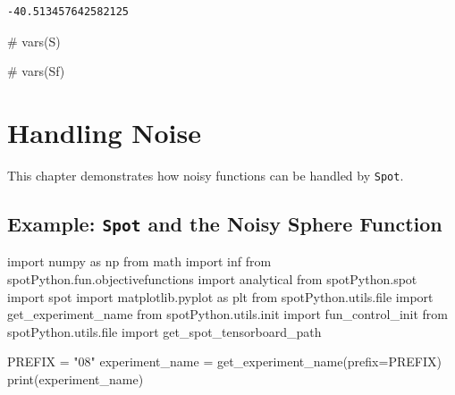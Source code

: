 \documentclass[
  letterpaper,
  DIV=11,
  numbers=noendperiod]{scrreprt}
\newenvironment{Shaded}{\begin{snugshade}}{\end{snugshade}}
\newcommand{\BuiltInTok}[1]{\textcolor[rgb]{0.00,0.23,0.31}{#1}}
\newcommand{\CommentTok}[1]{\textcolor[rgb]{0.37,0.37,0.37}{#1}}
\newcommand{\ImportTok}[1]{\textcolor[rgb]{0.00,0.46,0.62}{#1}}
\newcommand{\NormalTok}[1]{\textcolor[rgb]{0.00,0.23,0.31}{#1}}
\newcommand{\OperatorTok}[1]{\textcolor[rgb]{0.37,0.37,0.37}{#1}}
\newcommand{\StringTok}[1]{\textcolor[rgb]{0.13,0.47,0.30}{#1}}
\begin{document}
\begin{verbatim}
-40.513457642582125
\end{verbatim}

\begin{Shaded}
\begin{Highlighting}[]
\CommentTok{\# vars(S)}
\end{Highlighting}
\end{Shaded}

\begin{Shaded}
\begin{Highlighting}[]
\CommentTok{\# vars(Sf)}
\end{Highlighting}
\end{Shaded}

\hypertarget{sec-noise}{%
\chapter{Handling Noise}\label{sec-noise}}

This chapter demonstrates how noisy functions can be handled by
\texttt{Spot}.

\hypertarget{example-spot-and-the-noisy-sphere-function}{%
\section{\texorpdfstring{Example: \texttt{Spot} and the Noisy Sphere
Function}{Example: Spot and the Noisy Sphere Function}}\label{example-spot-and-the-noisy-sphere-function}}

\begin{Shaded}
\begin{Highlighting}[]
\ImportTok{import}\NormalTok{ numpy }\ImportTok{as}\NormalTok{ np}
\ImportTok{from}\NormalTok{ math }\ImportTok{import}\NormalTok{ inf}
\ImportTok{from}\NormalTok{ spotPython.fun.objectivefunctions }\ImportTok{import}\NormalTok{ analytical}
\ImportTok{from}\NormalTok{ spotPython.spot }\ImportTok{import}\NormalTok{ spot}
\ImportTok{import}\NormalTok{ matplotlib.pyplot }\ImportTok{as}\NormalTok{ plt}
\ImportTok{from}\NormalTok{ spotPython.utils.}\BuiltInTok{file} \ImportTok{import}\NormalTok{ get\_experiment\_name}
\ImportTok{from}\NormalTok{ spotPython.utils.init }\ImportTok{import}\NormalTok{ fun\_control\_init}
\ImportTok{from}\NormalTok{ spotPython.utils.}\BuiltInTok{file} \ImportTok{import}\NormalTok{ get\_spot\_tensorboard\_path}

\NormalTok{PREFIX }\OperatorTok{=} \StringTok{"08"}
\NormalTok{experiment\_name }\OperatorTok{=}\NormalTok{ get\_experiment\_name(prefix}\OperatorTok{=}\NormalTok{PREFIX)}
\BuiltInTok{print}\NormalTok{(experiment\_name)}
\end{Highlighting}
\end{Shaded}
\end{document}
